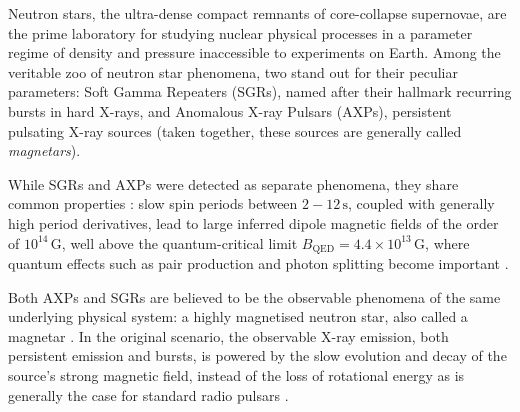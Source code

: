 \documentclass[12pt]{emulateapj}
\begin{document}
Neutron stars, the ultra-dense compact remnants of core-collapse supernovae, are the prime laboratory for studying nuclear 
physical processes in a parameter regime of density and pressure inaccessible to experiments on Earth. 
Among the veritable zoo of neutron star phenomena, two stand out for their peculiar parameters: Soft Gamma Repeaters (SGRs),
named after their hallmark recurring bursts in hard X-rays, and Anomalous X-ray Pulsars (AXPs), persistent pulsating X-ray
sources (taken together, these sources are generally called {\it magnetars}). 

While SGRs and AXPs were detected as separate phenomena, they share common properties \citep[for general overviews of both phenomena, see ][]{woods2006,mereghetti2011}: slow spin periods between
$2 - 12 \, \mathrm{s}$, coupled with generally high period derivatives, lead to large inferred dipole magnetic fields of
the order of $10^{14} \, \mathrm{G}$, well above the quantum-critical limit $B_{\mathrm{QED}} = 4.4 \times 10^{13} \, \mathrm{G}$,
where quantum effects such as pair production and photon splitting become important \citep[although three sources have been 
identified with properties similar to magnetars, but inferred dipole fields below this limit;][]{vanderhorst2010,esposito2010,rea2010,rea2012,scholz2012,rea2014}. 

Both AXPs and SGRs are believed to be the observable phenomena of the same underlying physical system: a highly magnetised
neutron star, also called a magnetar \citep{duncan1992,thompson1995}. In the original scenario, the observable X-ray emission, both persistent emission and bursts, 
is powered by the slow evolution and decay of the source's strong magnetic field, instead of the loss of rotational energy as 
is generally the case for standard radio pulsars \citep{thompson1995,thompson2001}. 

\end{document}
